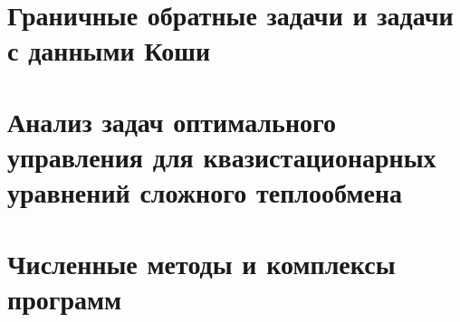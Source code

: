 \documentclass[a4paper,14pt,oneside,openany]{memoir}
\begin{document}
    \gappto\captionsrussian{\unskip} %
    



    \chapter{Граничные обратные задачи и задачи с данными Коши}\label{ch:ch2}
    
    
    


    \chapter{Анализ задач оптимального управления для квазистационарных уравнений сложного теплообмена}\label{ch:ch3}
    
    
    


    \chapter{Численные методы и комплексы программ}\label{ch:ch4}
    


    \setcounter{totalchapter}{\value{chapter}} %

    \appendix
    \setlength{\midchapskip}{20pt}
    \renewcommand*{\afterchapternum}{\par\nobreak\vskip \midchapskip}
    \renewcommand\thechapter{\Asbuk{chapter}} %


    \setcounter{totalappendix}{\value{chapter}} %
\end{document}
